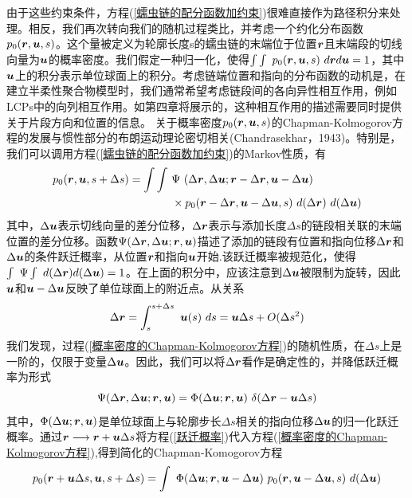 由于这些约束条件，方程(\ref{蠕虫链的配分函数加约束})很难直接作为路径积分来处理。相反，我们再次转向我们的随机过程类比，并考虑一个约化分布函数$p_0(\bm{r},\bm{u},s)$。这个量被定义为轮廓长度s的蠕虫链的末端位于位置$\bm{r}$且末端段的切线向量为$\bm{u}$的概率密度。我们假定一种归一化，使得$\int \int  \ p_0(\bm{r},\bm{u},s)\ d\bm{r} d\bm{u}=1$，其中$\bm{u}$上的积分表示单位球面上的积分。考虑链端位置和指向的分布函数的动机是，在建立半柔性聚合物模型时，我们通常希望考虑链段间的各向异性相互作用，例如LCPs中的向列相互作用。如第四章将展示的，这种相互作用的描述需要同时提供关于片段方向和位置的信息。
关于概率密度$p_0(\bm{r},\bm{u},s)$的Chapman-Kolmogorov方程的发展与惯性部分的布朗运动理论密切相关(Chandrasekhar，1943)。特别是，我们可以调用方程(\ref{蠕虫链的配分函数加约束})的Markov性质，有\\
\begin{equation}
\begin{aligned}
	p_0(\bm{r},\bm{u},s+\Delta s)=\int \int \ &\Psi\  (\Delta \bm{r},\Delta \bm{u};\bm{r}-\Delta \bm{r},\bm{u}-\Delta \bm{u})\\ &\times p_0(\bm{r}-\Delta \bm{r},\bm{u}-\Delta \bm{u},s) \  d(\Delta \bm{r}) \ d(\Delta \bm{u})\label{概率密度的Chapman-Kolmogorov方程}
\end{aligned}
\end{equation}
其中，$\Delta\bm{u}$表示切线向量的差分位移，$\Delta \bm{r}$表示与添加长度$\Delta s$的链段相关联的末端位置的差分位移。函数$\Psi(\Delta \bm{r},\Delta \bm{u};\bm{r},\bm{u})$描述了添加的链段有位置和指向位移$\Delta \bm{r}$和$\Delta \bm{u}$的条件跃迁概率，从位置$\bm{r}$和指向$\bm{u}$开始.该跃迁概率被规范化，使得$\int \ \Psi \int\ d(\Delta \bm{r}) d(\Delta \bm{u})=1$。在上面的积分中，应该注意到$\Delta\bm{u}$被限制为旋转，因此$\bm{u}$和$\bm{u}-\Delta \bm{u}$反映了单位球面上的附近点。从关系\\
\begin{equation}
\Delta \br = \int_{s}^{s+\Delta s}\ \bu(s)\ 
ds= \bu\Delta s +O(\Delta s ^2)
\end{equation}
我们发现，过程(\ref{概率密度的Chapman-Kolmogorov方程})的随机性质，在$\Delta s$上是一阶的，仅限于变量$\Delta \bm{u}$。因此，我们可以将$\Delta \bm{r}$看作是确定性的，并降低跃迁概率为形式\\
\begin{equation}
	\Psi(\Delta \bm{r} ,\Delta \bm{u} ;\bm{r}, \bm{u})=\Phi(\Delta \bm{u};\bm{r},\bm{u})\ \delta(\Delta \bm{r}-\bm{u}\Delta s)\label{跃迁概率}
\end{equation}
其中，$\Phi(\Delta \bm{u};\bm{r},\bm{u})$是单位球面上与轮廓步长$\Delta s$相关的指向位移$\Delta \bm{u}$的归一化跃迁概率。通过$\bm{r}\longrightarrow \bm{r}+\bm{u}\Delta s$将方程(\ref{跃迁概率})代入方程(\ref{概率密度的Chapman-Kolmogorov方程}),得到简化的Chapman-Komogorov方程\\
\begin{equation}
	p_0(\br+\bu\Delta s,\bu,s+\Delta s)=\int\ \Phi(\Delta \bu ;\br,\bu-\Delta \bu)\ p_0(\br,\bu-\Delta \bu,s)\  d (\Delta \bu)\label{简化的Chapman-Komogorov方程}
\end{equation}

